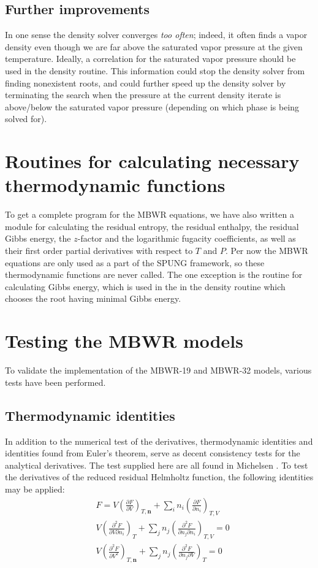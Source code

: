 \documentclass[english]{../thermomemo/thermomemo}
\newcommand*{\pder}[2]{\left(\frac{\partial #1}{\partial #2}\right)}
\newcommand*{\pdder}[2]{\left(\frac{\partial^2 #1}{\partial #2^2}\right)}
\newcommand*{\pdcross}[3]{\left(\frac{\partial^2 #1}{\partial #2 \partial #3}\right)}
\numberwithin{equation}{section}
\begin{document}
\subsection{Further improvements}
In one sense the density solver converges \textit{too often}; indeed,
it often finds a vapor density even though we are far above the saturated vapor
pressure at the given temperature. Ideally, a correlation for the saturated
vapor pressure should be used in the density routine. This information
could stop the density solver from finding nonexistent roots, and
could further speed up the density solver by terminating the search
when the pressure at the current density iterate is above/below the
saturated vapor pressure (depending on which phase is being solved
for).

\section{Routines for calculating necessary thermodynamic functions}
To get a complete program for the MBWR equations, we have also written
a module for calculating the residual entropy, the residual enthalpy,
the residual Gibbs energy, the $z$-factor and the logarithmic fugacity
coefficients, as well as their first order partial derivatives with
respect to $T$ and $P$. Per now the MBWR equations are only used as a
part of the SPUNG framework, so these thermodynamic functions are
never called. The one exception is the routine for calculating Gibbs
energy, which is used in the in the density routine which chooses the
root having minimal Gibbs energy.


\section{Testing the MBWR models}
To validate the implementation of the MBWR-19 and MBWR-32 models,
various tests have been performed.

\subsection{Thermodynamic identities}
In addition to the numerical test of the derivatives, thermodynamic
identities and identities found from Euler's theorem, serve as decent
consistency tests for the analytical derivatives. The test supplied
here are all found in Michelsen \cite{Michelsen07}. To test the derivatives of the
reduced residual Helmholtz function, the following identities may be
applied:
\begin{align}
  \label{test:1}
  & F = V \pder{F}{V}_{T,\textbf{n}} + \sum_i n_i \pder{F}{n_i}_{T,V} \\
  \label{test:2}
  & V \pdcross{F}{V}{n_i}_T + \sum_j n_j \pdcross{F}{n_j}{n_i}_{T,V} = 0 \\
  \label{test:3}
  & V \pdder{F}{V}_{T,\textbf{n}} + \sum_j n_j \pdcross{F}{n_j}{V}_T =
  0
\end{align}
\end{document}
